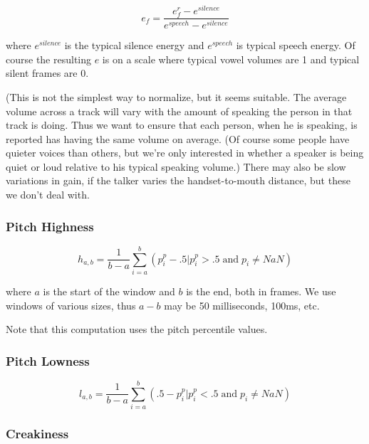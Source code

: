 \documentclass[11pt]{article}
\begin{document}
\begin{equation}
e_f = \frac{ e_f^r - e^{silence} }{e^{speech} - e ^{silence}}
\end{equation}

where $e^{silence}$ is the typical silence energy and $e^{speech}$ is
typical speech energy.  Of course the resulting $e$ is on a scale
where typical vowel volumes are 1 and typical silent frames are 0.

(This is not the simplest way to normalize, but it seems suitable.
The average volume across a track will vary with the amount of
speaking the person in that track is doing.  Thus we want to ensure
that each person, when he is speaking, is reported has having the same
volume on average.  (Of course some people have quieter voices than
others, but we're only interested in whether a speaker is being quiet
or loud relative to his typical speaking volume.)  There may also be
slow variations in gain, if the talker varies the handset-to-mouth
distance, but these we don't deal with.

\subsubsection{Pitch Highness}

\begin{equation}
h_{a,b} = \frac{1}{b-a} \sum\limits_{i=a}^b (p_i^p -.5 | p_i^p> .5 \operatorname{and} p_i \neq NaN)
\end{equation}

where $a$ is the start of the window and $b$ is the end, both in
frames.  We use windows of various sizes, thus $a-b$ may be 50
milliseconds, 100ms, etc.

Note that this computation uses the pitch
percentile values.



\subsubsection{Pitch Lowness}

\begin{equation}
l_{a,b} = \frac{1}{b-a} \sum\limits_{i=a}^b ( .5 - p_i^p | p_i^p < .5 \operatorname{and} p_i \neq NaN)
\end{equation}

\subsubsection{Creakiness}
\end{document}
